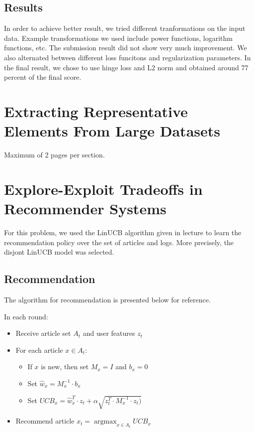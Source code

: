 \documentclass[a4paper, 11pt]{article}
\begin{document}
\subsection{Results}
In order to achieve better result, we tried different tranformations on the input data. Example transformations we used include power functions, logarithm functions, etc. The submission result did not show very much improvement. We also alternated between different loss funcitons and regularization parameters. In the final result, we chose to use hinge loss and L2 norm and obtained around 77 percent of the final score.

\newpage

\section{Extracting Representative Elements From Large Datasets}
Maximum of 2 pages per section.

\newpage

\section{Explore-Exploit Tradeoffs in Recommender Systems}
For this problem, we used the LinUCB algorithm given in lecture to learn the recommendation policy over the set of articles and logs. More precisely, the disjont LinUCB model was selected.

\subsection{Recommendation}

The algorithm for recommendation is presented below for reference.
\newline

In each round:
\begin{itemize}

\item Receive article set $A_t$ and user features $z_t$
\item For each article $x \in A_t$:

\begin{itemize}

    \item If $x$ is new, then set $M_x = I$ and $b_x = 0$
    \item Set $\hat{w}_x = M_x^{-1} \cdot b_x$
    \item Set $UCB_x = \hat{w}_x^T \cdot z_t + \alpha \sqrt{z_t^T \cdot M_x^{-1} \cdot z_t)}$

\end{itemize}
        
\item Recommend article $x_t = 
    \operatorname{argmax}_{x \in A_t} UCB_x$
        
\end {itemize}
\end{document}
